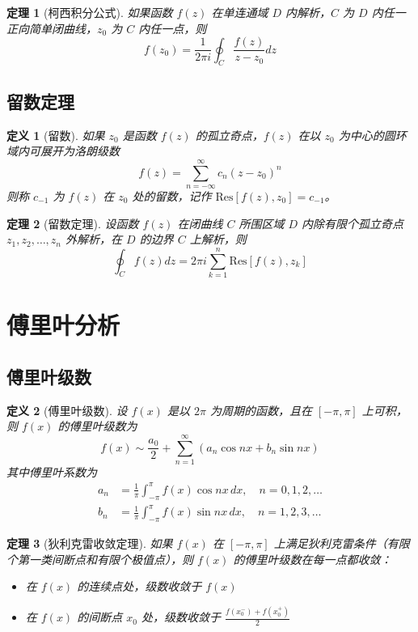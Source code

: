 \documentclass[12pt]{article}
\newtheorem{theorem}{定理}
\newtheorem{definition}{定义}
\begin{document}
\begin{theorem}[柯西积分公式]
如果函数 $f(z)$ 在单连通域 $D$ 内解析，$C$ 为 $D$ 内任一正向简单闭曲线，$z_0$ 为 $C$ 内任一点，则
$$f(z_0) = \frac{1}{2\pi i} \oint_C \frac{f(z)}{z - z_0} dz$$
\end{theorem}

\subsection{留数定理}

\begin{definition}[留数]
如果 $z_0$ 是函数 $f(z)$ 的孤立奇点，$f(z)$ 在以 $z_0$ 为中心的圆环域内可展开为洛朗级数
$$f(z) = \sum_{n=-\infty}^{\infty} c_n (z - z_0)^n$$
则称 $c_{-1}$ 为 $f(z)$ 在 $z_0$ 处的留数，记作 $\text{Res}[f(z), z_0] = c_{-1}$。
\end{definition}

\begin{theorem}[留数定理]
设函数 $f(z)$ 在闭曲线 $C$ 所围区域 $D$ 内除有限个孤立奇点 $z_1, z_2, \ldots, z_n$ 外解析，在 $D$ 的边界 $C$ 上解析，则
$$\oint_C f(z) dz = 2\pi i \sum_{k=1}^{n} \text{Res}[f(z), z_k]$$
\end{theorem}


\section{傅里叶分析}

\subsection{傅里叶级数}

\begin{definition}[傅里叶级数]
设 $f(x)$ 是以 $2\pi$ 为周期的函数，且在 $[-\pi, \pi]$ 上可积，则 $f(x)$ 的傅里叶级数为
$$f(x) \sim \frac{a_0}{2} + \sum_{n=1}^{\infty} (a_n \cos nx + b_n \sin nx)$$
其中傅里叶系数为
\begin{align}
a_n &= \frac{1}{\pi} \int_{-\pi}^{\pi} f(x) \cos nx \, dx, \quad n = 0, 1, 2, \ldots \\
b_n &= \frac{1}{\pi} \int_{-\pi}^{\pi} f(x) \sin nx \, dx, \quad n = 1, 2, 3, \ldots
\end{align}
\end{definition}

\begin{theorem}[狄利克雷收敛定理]
如果 $f(x)$ 在 $[-\pi, \pi]$ 上满足狄利克雷条件（有限个第一类间断点和有限个极值点），则 $f(x)$ 的傅里叶级数在每一点都收敛：
\begin{itemize}
    \item 在 $f(x)$ 的连续点处，级数收敛于 $f(x)$
    \item 在 $f(x)$ 的间断点 $x_0$ 处，级数收敛于 $\frac{f(x_0^-) + f(x_0^+)}{2}$
\end{itemize}
\end{theorem}
\end{document}
